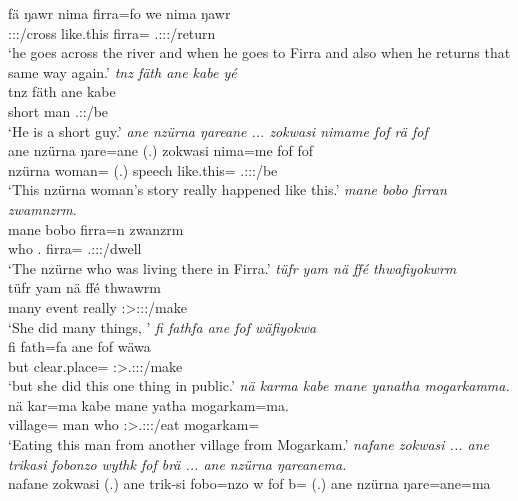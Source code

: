 \begin{exe}
	\gll fä ŋawr nima firra=fo  we nima ŋawr\\
	\Dist{} \Stsg:\Sbj:\Nonpast:\Ipfv/cross {like.this} firra=\All{} \Tsg.\Masc:\Sbj:\Nonpast:\Ipfv/return\\
	\trans `he goes across the river and when he goes to Firra and also when he returns that same way again.'
	\emph{tnz fäth ane kabe yé}\\
	\gll tnz fäth ane kabe \\
	short \Dim{} \Dem{} man \Tsg.\Masc:\Nonpast:\Ipfv/be\\
	\trans `He is a short guy.'
	\emph{ane nzürna ŋareane ... zokwasi nimame fof rä fof}\\
	\gll ane nzürna ŋare=ane (.) zokwasi nima=me fof  fof\\
	\Dem{} nzürna woman=\Poss{} (.) speech like.this=\Ins{} \Emph{} \Tsg.\F:\Sbj:\Nonpast:\Ipfv/be \Emph{}\\
	\trans `This nzürna woman's story really happened like this.'
	\emph{mane bobo firran zwamnzrm.}\\
	\gll mane bobo firra=n zwanzrm\\
	who \Med.\All{} firra=\Loc{} \Tsg.\F:\Sbj:\Pst:\Dur/dwell\\
	\trans `The nzürne who was living there in Firra.'
	\emph{tüfr yam nä ffé thwafiyokwrm}\\
	\gll tüfr yam nä ffé thwawrm\\
	many event \Indf{} really \Sg:\Sbj>\Stpl:\Obj:\Pst:\Dur/make\\
	\trans `She did many things, '
	\emph{fi fathfa ane fof wäfiyokwa}\\
	\gll fi fath=fa ane fof wäwa\\
	but clear.place=\Abl{} \Dem{} \Emph{} \Sg:\Sbj>\Tsg.\F:\Obj:\Pst:\Ipfv/make\\
	\trans `but she did this one thing in public.'
	\emph{nä karma kabe mane yanatha mogarkamma.}\\
	\gll nä kar=ma kabe mane yatha mogarkam=ma.\\
	\Indf{} village=\Char{} man who \Sg:\Sbj>\Tsg.\Masc:\Obj:\Pst:\Ipfv/eat mogarkam=\Char\\
	\trans `Eating this man from another village from Mogarkam.'
	\emph{nafane zokwasi ... ane trikasi fobonzo wythk fof brä ... ane nzürna ŋareanema.}\\
	\gll nafane zokwasi (.) ane trik-si fobo=nzo w fof b= (.) ane nzürna ŋare=ane=ma\\

\end{exe}

